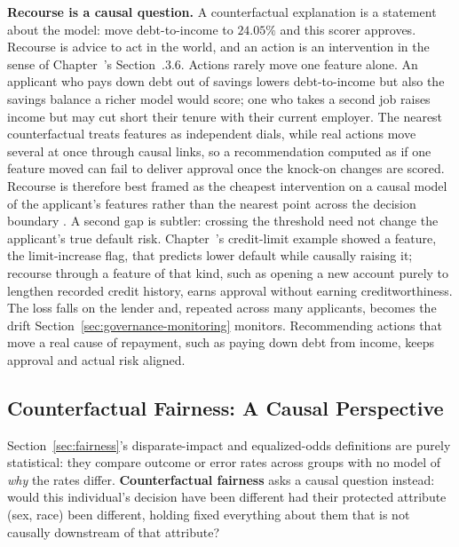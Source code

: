 \documentclass[../ai_in_finance]{subfiles}
\begin{document}
\textbf{Recourse is a causal question.} A counterfactual explanation is a statement about the model: move debt-to-income to $24.05\%$ and this scorer approves. Recourse is advice to act in the world, and an action is an intervention in the sense of Chapter~'s Section~.3.6. Actions rarely move one feature alone. An applicant who pays down debt out of savings lowers debt-to-income but also the savings balance a richer model would score; one who takes a second job raises income but may cut short their tenure with their current employer. The nearest counterfactual treats features as independent dials, while real actions move several at once through causal links, so a recommendation computed as if one feature moved can fail to deliver approval once the knock-on changes are scored. Recourse is therefore best framed as the cheapest intervention on a causal model of the applicant's features rather than the nearest point across the decision boundary \parencite{karimi2021algorithmic}. A second gap is subtler: crossing the threshold need not change the applicant's true default risk. Chapter~'s credit-limit example showed a feature, the limit-increase flag, that predicts lower default while causally raising it; recourse through a feature of that kind, such as opening a new account purely to lengthen recorded credit history, earns approval without earning creditworthiness. The loss falls on the lender and, repeated across many applicants, becomes the drift Section~\ref{sec:governance-monitoring} monitors. Recommending actions that move a real cause of repayment, such as paying down debt from income, keeps approval and actual risk aligned.

\subsection{Counterfactual Fairness: A Causal Perspective}
\label{sec:counterfactual-fairness}

Section~\ref{sec:fairness}'s disparate-impact and equalized-odds definitions are purely statistical: they compare outcome or error rates across groups with no model of \emph{why} the rates differ. \textbf{Counterfactual fairness} \parencite{kusner2017counterfactual} asks a causal question instead: would this individual's decision have been different had their protected attribute (sex, race) been different, holding fixed everything about them that is not causally downstream of that attribute?
\end{document}
